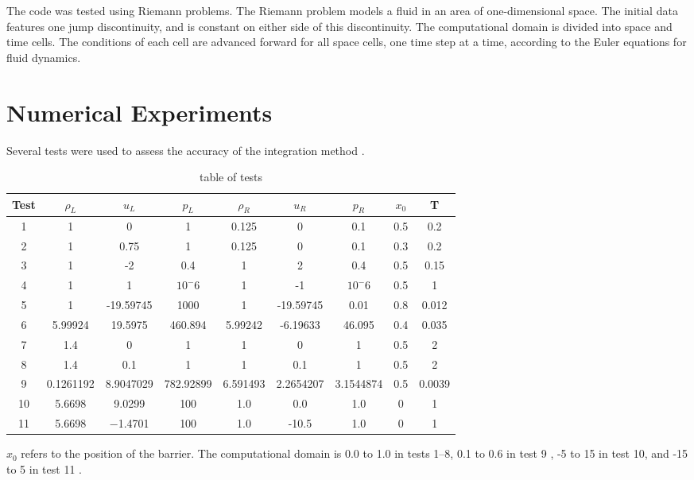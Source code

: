 \documentclass[letterpaper,12pt]{article}
\begin{document}
The code was tested using Riemann problems. The Riemann problem models a fluid in an area of one-dimensional space. The initial data features one jump discontinuity, and is constant on either side of this discontinuity. The computational domain is divided into space and time cells. The conditions of each cell are advanced forward for all space cells, one time step at a time, according to the Euler equations for fluid dynamics. \cite{Leveque2002}


\section{Numerical Experiments}
Several tests were used to assess the accuracy of the integration method \cite{LiskaWendroff2003}. 
\begin{table}[h!]
\begin{center}
\begin{tabular}{ |c|c c c|c c c|c c| }
 \hline
 Test & $\rho_L$ & $u_L$ & $p_L$ & $\rho_R$ & $u_R$ & $p_R$ & $x_0$ & T \\
 \hline
 1 & 1 & 0 & 1 & 0.125 & 0 & 0.1 & 0.5 & 0.2 \\
 2 & 1 & 0.75 & 1 & 0.125 & 0 & 0.1 & 0.3 & 0.2 \\
 3 & 1 & -2 & 0.4 & 1 & 2 & 0.4 & 0.5 & 0.15 \\
 4 & 1 & 1 & $10^-6$ & 1 & -1 & $10^-6$ & 0.5 & 1 \\
 5 & 1 & -19.59745 & 1000 & 1 & -19.59745 & 0.01 & 0.8 & 0.012 \\
 6 & 5.99924 & 19.5975 & 460.894 & 5.99242 & -6.19633 & 46.095 & 0.4 & 0.035 \\
 7 & 1.4 & 0 & 1 & 1 & 0 & 1 & 0.5 & 2 \\
 8 & 1.4 & 0.1 & 1 & 1 & 0.1 & 1 & 0.5 & 2 \\
 9 & 0.1261192 & 8.9047029 & 782.92899 & 6.591493 & 2.2654207 & 3.1544874 & 0.5 & 0.0039 \\
10 & 5.6698 & 9.0299 & 100 & 1.0 & 0.0 & 1.0 & 0 & 1 \\
11 & 5.6698 & −1.4701 & 100 & 1.0 & -10.5 & 1.0 & 0 & 1 \\
 \hline
\end{tabular}
  \caption{table of tests}
  \label{tab:testtable}
\end{center}
\end{table}
$x_0$ refers to the position of the barrier. The computational domain is 0.0 to 1.0 in tests 1--8, 0.1 to 0.6 in test 9 \cite{LiskaWendroff2003}, -5 to 15 in test 10, and -15 to 5 in test 11 \cite{Leveque2002}. 
\end{document}
